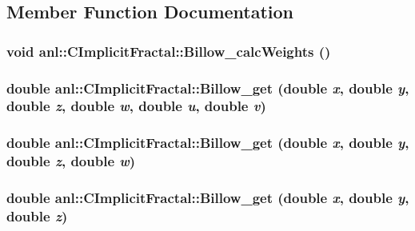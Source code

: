 \subsection{Member Function Documentation}
\hypertarget{classanl_1_1CImplicitFractal_a4af9b4cb67e0e7c1e44195b2c5f4c0d9}{
\subsubsection[{Billow\_\-calcWeights}]{\setlength{\rightskip}{0pt plus 5cm}void anl::CImplicitFractal::Billow\_\-calcWeights ()}}
\label{classanl_1_1CImplicitFractal_a4af9b4cb67e0e7c1e44195b2c5f4c0d9}
\hypertarget{classanl_1_1CImplicitFractal_a014fecebc7fe6ff0adb677419c9fdba4}{
\subsubsection[{Billow\_\-get}]{\setlength{\rightskip}{0pt plus 5cm}double anl::CImplicitFractal::Billow\_\-get (double {\em x}, \/  double {\em y}, \/  double {\em z}, \/  double {\em w}, \/  double {\em u}, \/  double {\em v})}}
\label{classanl_1_1CImplicitFractal_a014fecebc7fe6ff0adb677419c9fdba4}
\hypertarget{classanl_1_1CImplicitFractal_a4a103443ba1e739d63f8c1d046a3e114}{
\subsubsection[{Billow\_\-get}]{\setlength{\rightskip}{0pt plus 5cm}double anl::CImplicitFractal::Billow\_\-get (double {\em x}, \/  double {\em y}, \/  double {\em z}, \/  double {\em w})}}
\label{classanl_1_1CImplicitFractal_a4a103443ba1e739d63f8c1d046a3e114}
\hypertarget{classanl_1_1CImplicitFractal_aab8ab114b19b3e04dae0d87905034d58}{
\subsubsection[{Billow\_\-get}]{\setlength{\rightskip}{0pt plus 5cm}double anl::CImplicitFractal::Billow\_\-get (double {\em x}, \/  double {\em y}, \/  double {\em z})}}
